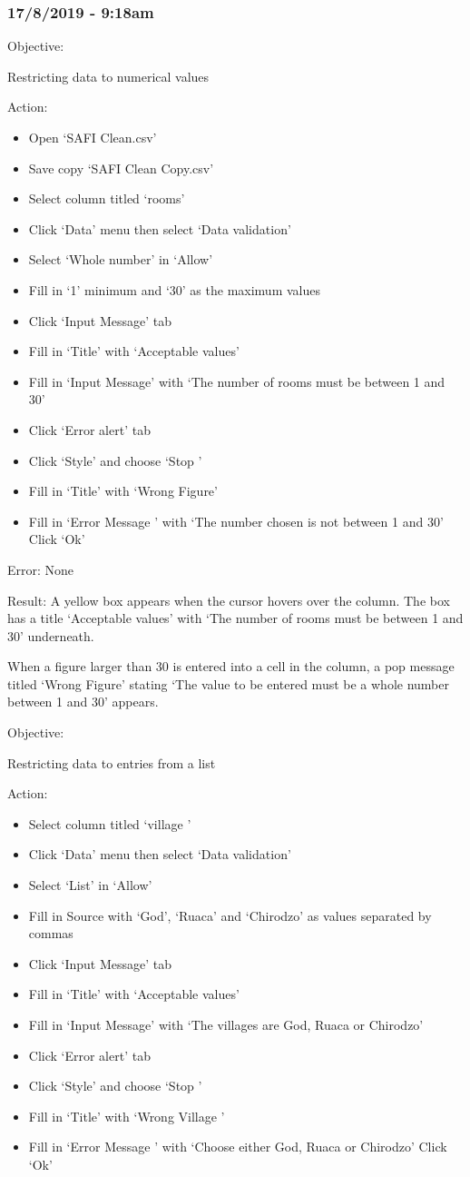 \documentclass{article}
\begin{document}
\subsubsection*{17/8/2019 - 9:18am}
Objective:\par
Restricting data to numerical values\par
Action:
\begin{itemize}
\item Open ‘SAFI Clean.csv’
\item Save copy ‘SAFI Clean Copy.csv’
\item Select column titled ‘rooms’
\item Click ‘Data’ menu then select ‘Data validation’
\item Select ‘Whole number’ in ‘Allow’
\item Fill in ‘1’ minimum and ‘30’ as the maximum values
\item Click ‘Input Message’ tab
\item Fill in ‘Title’ with ‘Acceptable values’
\item Fill in ‘Input Message’ with ‘The number of rooms must be between 1 and 30’
\item Click ‘Error alert’ tab
\item Click ‘Style’ and choose ‘Stop ’
\item Fill in ‘Title’ with ‘Wrong Figure’
\item Fill in ‘Error Message ’ with ‘The number chosen is not between 1 and 30’
Click ‘Ok’
\end{itemize}
Error: None\par
Result: A yellow box appears when the cursor hovers over the column. The box has a title ‘Acceptable values’ with ‘The number of rooms must be between 1 and 30’ underneath.\par
When a figure larger than 30 is entered into a cell in the column, a pop message titled ‘Wrong Figure’ stating ‘The value to be entered must be a whole number between 1 and 30’ appears.\par
Objective:\par
Restricting data to entries from a list\par
Action:
\begin{itemize}
\item Select column titled ‘village ’
\item Click ‘Data’ menu then select ‘Data validation’
\item Select ‘List’ in ‘Allow’
\item Fill in Source with ‘God’, ‘Ruaca’ and ‘Chirodzo’ as values separated by commas
\item Click ‘Input Message’ tab
\item Fill in ‘Title’ with ‘Acceptable values’
\item Fill in ‘Input Message’ with ‘The villages are God, Ruaca or Chirodzo’
\item Click ‘Error alert’ tab
\item Click ‘Style’ and choose ‘Stop ’
\item Fill in ‘Title’ with ‘Wrong Village ’
\item Fill in ‘Error Message ’ with ‘Choose either God, Ruaca or Chirodzo’
Click ‘Ok’
\end{itemize}
\end{document}
